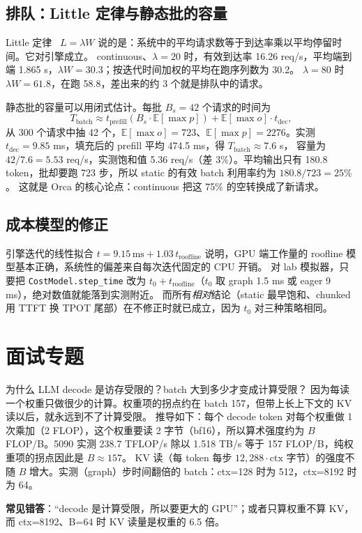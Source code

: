 \documentclass[11pt,a4paper]{ctexart}
\begin{document}
\subsection{排队：Little 定律与静态批的容量}
Little 定律~\cite{little1961} $L=\lambda W$ 说的是：系统中的平均请求数等于到达率乘以平均停留时间。它对引擎成立。
continuous、$\lambda=20$ 时，有效到达率 16.26 req/s，平均端到端 1.865 s，$\lambda W = 30.3$；按迭代时间加权的平均在跑序列数为 30.2。
$\lambda=80$ 时 $\lambda W = 61.8$，在跑 58.8，差出来的约 3 个就是排队中的请求。

静态批的容量可以用闭式估计。每批 $B_s=42$ 个请求的时间为
\begin{equation}
T_{\text{batch}} \approx t_{\text{prefill}}(B_s\cdot \mathbb{E}[\max p]) + \mathbb{E}[\max o]\cdot t_{\text{dec}},
\end{equation}
从 300 个请求中抽 42 个，$\mathbb{E}[\max o]=723$、$\mathbb{E}[\max p]=2276$。实测 $t_{\text{dec}}=9.85$ ms，填充后的 prefill 平均 474.5 ms，得 $T_{\text{batch}}\approx7.6$ s，
容量为 $42/7.6 = 5.53$ req/s，实测饱和值 5.36 req/s（差 3\%）。平均输出只有 180.8 token，批却要跑 723 步，所以 static 的有效 batch 利用率约为 $180.8/723 = 25\%$。
这就是 Orca 的核心论点：continuous 把这 75\% 的空转换成了新请求。

\subsection{成本模型的修正}
引擎迭代的线性拟合 $t = 9.15\,\text{ms} + 1.03\,t_{\text{roofline}}$ 说明，GPU 端工作量的 roofline 模型基本正确，系统性的偏差来自每次迭代固定的 CPU 开销。
对 lab 模拟器，只要把 \texttt{CostModel.step\_time} 改为 $t_0 + t_{\text{roofline}}$（$t_0$ 取 graph 1.5 ms 或 eager 9 ms），绝对数值就能落到实测附近。
而所有\emph{相对}结论（static 最早饱和、chunked 用 TTFT 换 TPOT 尾部）在不修正时就已成立，因为 $t_0$ 对三种策略相同。

\section{面试专题}

\begin{iqbox}{为什么 LLM decode 是访存受限的？batch 大到多少才变成计算受限？}
因为每读一个权重只做很少的计算。权重项的拐点约在 batch 157，但带上长上下文的 KV 读以后，就永远到不了计算受限。
推导如下：每个 decode token 对每个权重做 1 次乘加（2 FLOP），这个权重要读 2 字节（bf16），所以算术强度约为 $B$ FLOP/B。5090 实测 238.7 TFLOP/s 除以 1.518 TB/s 等于 157 FLOP/B，纯权重项的拐点因此是 $B\approx157$。
KV 读（每 token 每步 $12{,}288\cdot\text{ctx}$ 字节）的强度不随 $B$ 增大。实测（graph）步时间翻倍的 batch：ctx=128 时为 512，ctx=8192 时为 64。
\par\textbf{常见错答}：“decode 是计算受限，所以要更大的 GPU”；或者只算权重不算 KV，而 ctx=8192、B=64 时 KV 读量是权重的 6.5 倍。
\end{iqbox}
\end{document}
